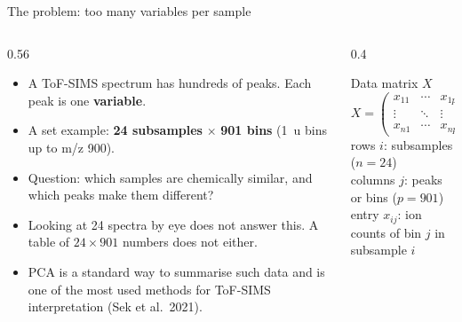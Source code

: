 \documentclass[aspectratio=169,10pt]{beamer}
\newcommand{\hl}[1]{{\color{warm}\bfseries #1}}
\newcommand{\src}[1]{{\color{muted}\scriptsize #1}}
\begin{document}
\begin{frame}{The problem: too many variables per sample}
  \begin{columns}[T]
    \begin{column}{0.56\textwidth}
      \begin{itemize}\setlength\itemsep{2mm}
        \item A ToF-SIMS spectrum has hundreds of peaks. Each peak is one \hl{variable}.
        \item A set example: \hl{24 subsamples} $\times$ \hl{901 bins} (1~u bins up to m/z 900).
        \item Question: which samples are chemically similar, and which peaks make them different?
        \item Looking at 24 spectra by eye does not answer this. A table of $24\times 901$ numbers does not either.
        \item PCA is a standard way to summarise such data and is one of the most used methods for ToF-SIMS interpretation \src{(Sek et al.\ 2021)}.
      \end{itemize}
    \end{column}
    \begin{column}{0.4\textwidth}
      \begin{block}{Data matrix $X$}
        \[
        X=\begin{pmatrix}
        x_{11}&\cdots&x_{1p}\\
        \vdots&\ddots&\vdots\\
        x_{n1}&\cdots&x_{np}
        \end{pmatrix}
        \]
        rows $i$: subsamples ($n=24$)\\
        columns $j$: peaks or bins ($p=901$)\\
        entry $x_{ij}$: ion counts of bin $j$ in subsample $i$
      \end{block}
    \end{column}
  \end{columns}
\end{frame}
\end{document}
